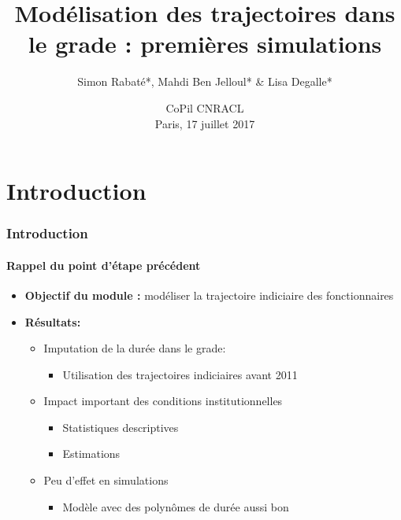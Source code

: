 \documentclass[xcolor=table,ignorenonframetext,12pt]{beamer}
\title{Modélisation des trajectoires dans le grade : premières simulations}
\author{Simon Rabaté*, Mahdi Ben Jelloul* \& Lisa Degalle*}
\institute{
  \inst{*} IPP
}
\date{CoPil CNRACL\\
	Paris, 17 juillet 2017}
\newenvironment{choixmarges}[2]{\begin{list}{}{%
\setlength{\topsep}{0pt}%
\setlength{\leftmargin}{0pt}%
\setlength{\rightmargin}{0pt}%
\setlength{\listparindent}{\parindent}%
\setlength{\itemindent}{\parindent}%
\setlength{\parsep}{0pt plus 1pt}%
\addtolength{\leftmargin}{#1}%
\addtolength{\rightmargin}{#2}%
}\item }{\end{list}}
\begin{document}
\frame{\maketitle}





\section{Introduction}


\begin{frame}
\frametitle{Introduction}
\framesubtitle{Rappel du point d'étape précédent}


\begin{choixmarges}{-0.5cm}{-0.5cm}



\begin{itemize}
\item \textbf{Objectif du module :} modéliser la trajectoire indiciaire des fonctionnaires
\vspace{0.1cm}


\item \textbf{Résultats:}  


\begin{itemize}

\item Imputation de la durée dans le grade: 

\begin{itemize}
\item Utilisation des trajectoires indiciaires avant 2011
\end{itemize}

\item Impact important des conditions institutionnelles
\begin{itemize}
\item Statistiques descriptives
\item Estimations
\end{itemize}

\item Peu d'effet en simulations
\begin{itemize}
\item Modèle avec des polynômes de durée aussi bon
\end{itemize}


\end{itemize}
\end{itemize}
\end{choixmarges}
\end{frame}
\end{document}
